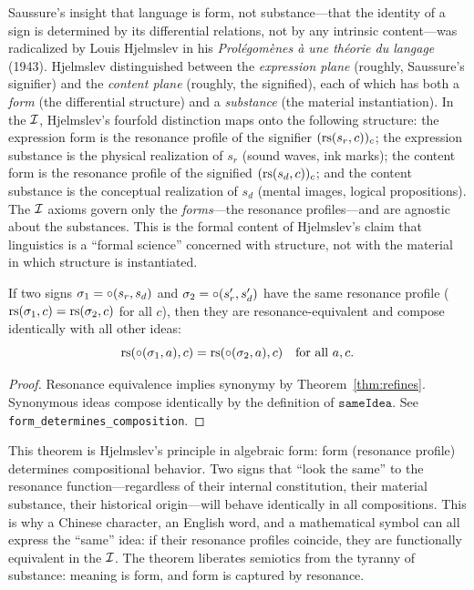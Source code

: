 \begin{remark}
Saussure's insight that language is form, not substance---that the identity of a sign is determined by its differential relations, not by any intrinsic content---was radicalized by Louis Hjelmslev in his \textit{Prol\'egom\`enes \`a une th\'eorie du langage} (1943). Hjelmslev distinguished between the \emph{expression plane} (roughly, Saussure's signifier) and the \emph{content plane} (roughly, the signified), each of which has both a \emph{form} (the differential structure) and a \emph{substance} (the material instantiation). In the $\mathcal{I}$, Hjelmslev's fourfold distinction maps onto the following structure: the expression form is the resonance profile of the signifier $(\mathrm{rs}(s_r, c))_c$; the expression substance is the physical realization of $s_r$ (sound waves, ink marks); the content form is the resonance profile of the signified $(\mathrm{rs}(s_d, c))_c$; and the content substance is the conceptual realization of $s_d$ (mental images, logical propositions). The $\mathcal{I}$ axioms govern only the \emph{forms}---the resonance profiles---and are agnostic about the substances. This is the formal content of Hjelmslev's claim that linguistics is a ``formal science'' concerned with structure, not with the material in which structure is instantiated.
\end{remark}

\begin{theorem}
\label{thm:form-determines}
If two signs $\sigma_1 = \circ(s_r, s_d)$ and $\sigma_2 = \circ(s_r', s_d')$ have the same resonance profile ($\mathrm{rs}(\sigma_1, c) = \mathrm{rs}(\sigma_2, c)$ for all $c$), then they are resonance-equivalent and compose identically with all other ideas:
\[
  \mathrm{rs}(\circ(\sigma_1, a), c) = \mathrm{rs}(\circ(\sigma_2, a), c) \quad \text{for all } a, c.
\]
\end{theorem}

\begin{proof}
Resonance equivalence implies synonymy by Theorem~\ref{thm:refines}. Synonymous ideas compose identically by the definition of $\texttt{sameIdea}$. See \texttt{form\_determines\_composition}.
\end{proof}

\begin{interpretation}
This theorem is Hjelmslev's principle in algebraic form: form (resonance profile) determines compositional behavior. Two signs that ``look the same'' to the resonance function---regardless of their internal constitution, their material substance, their historical origin---will behave identically in all compositions. This is why a Chinese character, an English word, and a mathematical symbol can all express the ``same'' idea: if their resonance profiles coincide, they are functionally equivalent in the $\mathcal{I}$. The theorem liberates semiotics from the tyranny of substance: meaning is form, and form is captured by resonance.
\end{interpretation}


